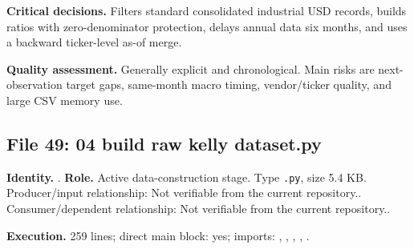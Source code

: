 \documentclass[
  11pt,
  a4paper]{article}
\begin{document}
\textbf{Critical decisions.} Filters standard consolidated industrial
USD records, builds ratios with zero-denominator protection, delays
annual data six months, and uses a backward ticker-level as-of merge.

\textbf{Quality assessment.} Generally explicit and chronological. Main
risks are next-observation target gaps, same-month macro timing,
vendor/ticker quality, and large CSV memory use.

\subsection{File 49: 04 build raw kelly
dataset.py}\label{file-4665453275340419529}

\textbf{Identity.} .
\textbf{Role.} Active data-construction stage. Type \texttt{.py}, size
5.4 KB. Producer/input relationship: Not verifiable from the current
repository.. Consumer/dependent relationship: Not verifiable from the
current repository..

\textbf{Execution.} 259 lines; direct main block: yes; imports:
, ,
,
,
.
\end{document}
